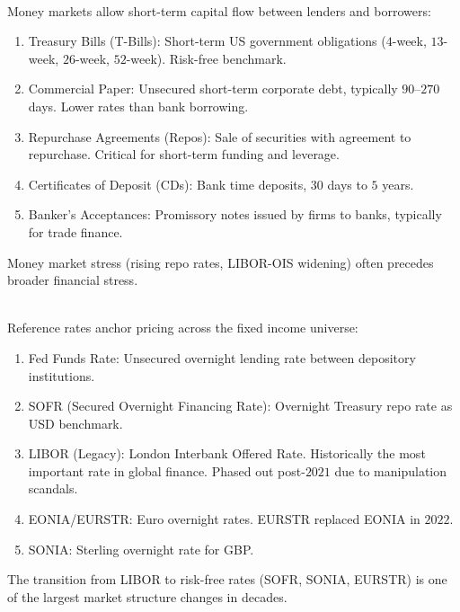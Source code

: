 \documentclass[a4paper,oneside,openany]{book}
\begin{document}
\begin{remark} \\
Money markets allow short-term capital flow between lenders and borrowers:
\begin{enumerate}[label=\roman*.]
\setlength{\itemsep}{0pt}
\item Treasury Bills (T-Bills): Short-term US government obligations ($4$-week, $13$-week, $26$-week, $52$-week). Risk-free benchmark.
\item Commercial Paper: Unsecured short-term corporate debt, typically $90$--$270$ days. Lower rates than bank borrowing.
\item Repurchase Agreements (Repos): Sale of securities with agreement to repurchase. Critical for short-term funding and leverage.
\item Certificates of Deposit (CDs): Bank time deposits, $30$ days to $5$ years.
\item Banker's Acceptances: Promissory notes issued by firms to banks, typically for trade finance.
\end{enumerate}
Money market stress (rising repo rates, LIBOR-OIS widening) often precedes broader financial stress.
\end{remark}

\begin{remark} \\
Reference rates anchor pricing across the fixed income universe:
\begin{enumerate}[label=\roman*.]
\setlength{\itemsep}{0pt}
\item Fed Funds Rate: Unsecured overnight lending rate between depository institutions.
\item SOFR (Secured Overnight Financing Rate): Overnight Treasury repo rate as USD benchmark.
\item LIBOR (Legacy): London Interbank Offered Rate. Historically the most important rate in global finance. Phased out post-$2021$ due to manipulation scandals.
\item EONIA/EURSTR: Euro overnight rates. EURSTR replaced EONIA in $2022$.
\item SONIA: Sterling overnight rate for GBP.
\end{enumerate}
The transition from LIBOR to risk-free rates (SOFR, SONIA, EURSTR) is one of the largest market structure changes in decades.
\end{remark}
\end{document}
